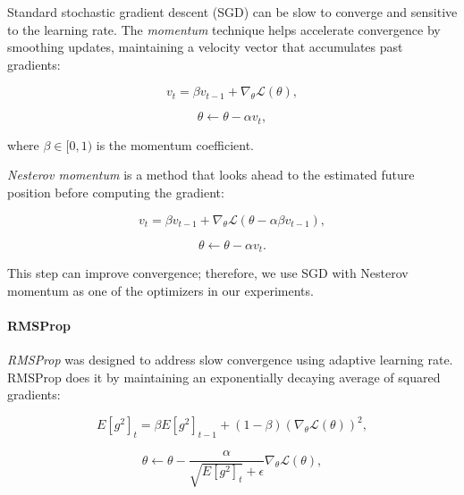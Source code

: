 Standard stochastic gradient descent (SGD) can be slow to converge and sensitive to the learning rate. The \emph{momentum} technique helps accelerate convergence by smoothing updates, maintaining a velocity vector that accumulates past gradients:

\begin{equation}
    v_t = \beta v_{t-1} + \nabla_\theta \mathcal{L}(\theta),
    \label{eq:momentum_velocity_sgd}
\end{equation}

\begin{equation}
    \theta \leftarrow \theta - \alpha v_t,
    \label{eq:momentum_update_sgd}
\end{equation}

where $\beta \in [0,1)$ is the momentum coefficient.  

\emph{Nesterov momentum} \cite{sutskever2013importance} is a method that looks ahead to the estimated future position before computing the gradient:

\begin{equation}
    v_t = \beta v_{t-1} + \nabla_\theta \mathcal{L}(\theta - \alpha \beta v_{t-1}),
    \label{eq:nesterov_velocity}
\end{equation}

\begin{equation}
    \theta \leftarrow \theta - \alpha v_t.
    \label{eq:nesterov_update}
\end{equation}

This step can improve convergence; therefore, we use SGD with Nesterov momentum as one of the optimizers in our experiments.

\paragraph{RMSProp}

\emph{RMSProp} \cite{hinton2012rmsprop} was designed to address slow convergence using adaptive learning rate. RMSProp does it by maintaining an exponentially decaying average of squared gradients:

\begin{equation}
    E[g^2]_t = \beta E[g^2]_{t-1} + (1 - \beta) (\nabla_\theta \mathcal{L}(\theta))^2,
    \label{eq:rmsprop_ema_new}
\end{equation}

\begin{equation}
    \theta \leftarrow \theta - \frac{\alpha}{\sqrt{E[g^2]_t} + \epsilon} \nabla_\theta \mathcal{L}(\theta),
    \label{eq:rmsprop_update_new}
\end{equation}

